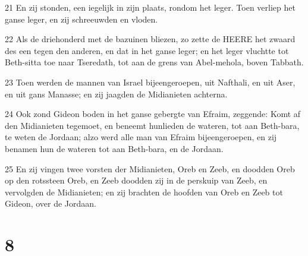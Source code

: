 \par 21 En zij stonden, een iegelijk in zijn plaats, rondom het leger. Toen verliep het ganse leger, en zij schreeuwden en vloden.
\par 22 Als de driehonderd met de bazuinen bliezen, zo zette de HEERE het zwaard des een tegen den anderen, en dat in het ganse leger; en het leger vluchtte tot Beth-sitta toe naar Tseredath, tot aan de grens van Abel-mehola, boven Tabbath.
\par 23 Toen werden de mannen van Israel bijeengeroepen, uit Nafthali, en uit Aser, en uit gans Manasse; en zij jaagden de Midianieten achterna.
\par 24 Ook zond Gideon boden in het ganse gebergte van Efraim, zeggende: Komt af den Midianieten tegemoet, en beneemt hunlieden de wateren, tot aan Beth-bara, te weten de Jordaan; alzo werd alle man van Efraim bijeengeroepen, en zij benamen hun de wateren tot aan Beth-bara, en de Jordaan.
\par 25 En zij vingen twee vorsten der Midianieten, Oreb en Zeeb, en doodden Oreb op den rotssteen Oreb, en Zeeb doodden zij in de perskuip van Zeeb, en vervolgden de Midianieten; en zij brachten de hoofden van Oreb en Zeeb tot Gideon, over de Jordaan.

\chapter{8}


